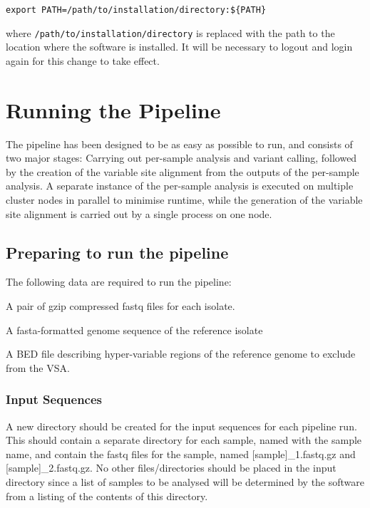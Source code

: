 \documentclass[a4paper,10pt,twoside]{article}
\newenvironment{tight_enumerate}{
\begin{enumerate}
  \setlength{\itemsep}{0pt}
  \setlength{\parskip}{0pt}
}{\end{enumerate}}
\begin{document}
\begin{verbatim}
export PATH=/path/to/installation/directory:${PATH}
\end{verbatim}

where {\tt /path/to/installation/directory} is replaced with the path to the
location where the software is installed.  It will be necessary to logout and
login again for this change to take effect. 

\section {Running the Pipeline}

The pipeline has been designed to be as easy as possible to run, and consists
of two major stages: Carrying out per-sample analysis and variant calling,
followed by the creation of the variable site alignment from the outputs of the
per-sample analysis. A separate instance of the per-sample analysis is executed
on multiple cluster nodes in parallel to minimise runtime, while the generation
of the variable site alignment is carried out by a single process on one node.

\subsection {Preparing to run the pipeline}

The following data are required to run the pipeline:

\begin{tight_enumerate}
\item A pair of gzip compressed fastq files for each isolate. 
\item A fasta-formatted genome sequence of the reference isolate
\item A BED file describing hyper-variable regions of the reference genome to exclude from the VSA.
\end{tight_enumerate}

\subsubsection {Input Sequences}

A new directory should be created for the input sequences for each pipeline
run. This should contain a separate directory for each sample, named with the
sample name, and contain the fastq files for the sample, named
[sample]\_1.fastq.gz and [sample]\_2.fastq.gz. No other files/directories
should be placed in the input directory since a list of samples to be analysed
will be determined by the software from a listing of the contents of this
directory.
\end{document}
